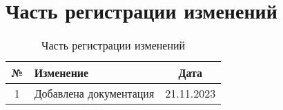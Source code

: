 \documentclass{article}
\begin{document}
\section{Часть регистрации изменений}

\begin{table}[h]
  \centering
  \caption{Часть регистрации изменений}
  \begin{tabular}{|c|p{8cm}|c|}
    \hline
    \textbf{№} & \textbf{Изменение}     & \textbf{Дата} \\
    \hline
    1          & Добавлена документация & 21.11.2023    \\
    \hline
  \end{tabular}
\end{table}
\end{document}
